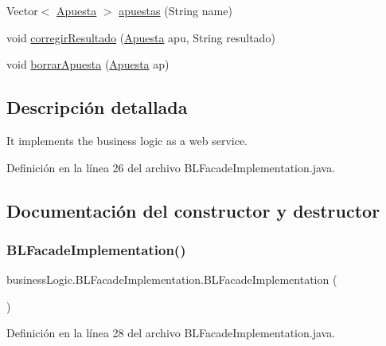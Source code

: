 \begin{DoxyCompactItemize}
\item 
Vector$<$ \mbox{\hyperlink{classdomain_1_1Apuesta}{Apuesta}} $>$ \mbox{\hyperlink{classbusinessLogic_1_1BLFacadeImplementation_a1da1d7f11768f7f37c395c534a19323b}{apuestas}} (String name)
\item 
void \mbox{\hyperlink{classbusinessLogic_1_1BLFacadeImplementation_a46e307bd8d9e04795bd15b815220d782}{corregir\+Resultado}} (\mbox{\hyperlink{classdomain_1_1Apuesta}{Apuesta}} apu, String resultado)
\item 
void \mbox{\hyperlink{classbusinessLogic_1_1BLFacadeImplementation_a3abfaef4d8952fca7a22d4b346fb155a}{borrar\+Apuesta}} (\mbox{\hyperlink{classdomain_1_1Apuesta}{Apuesta}} ap)
\end{DoxyCompactItemize}


\subsection{Descripción detallada}
It implements the business logic as a web service. 

Definición en la línea 26 del archivo B\+L\+Facade\+Implementation.\+java.



\subsection{Documentación del constructor y destructor}
\mbox{\label{classbusinessLogic_1_1BLFacadeImplementation_a5888a8388b131051ab729d6a326d9414}} 
\subsubsection{\texorpdfstring{BLFacadeImplementation()}{BLFacadeImplementation()}}
{\footnotesize\ttfamily business\+Logic.\+B\+L\+Facade\+Implementation.\+B\+L\+Facade\+Implementation (\begin{DoxyParamCaption}{ }\end{DoxyParamCaption})}



Definición en la línea 28 del archivo B\+L\+Facade\+Implementation.\+java.


